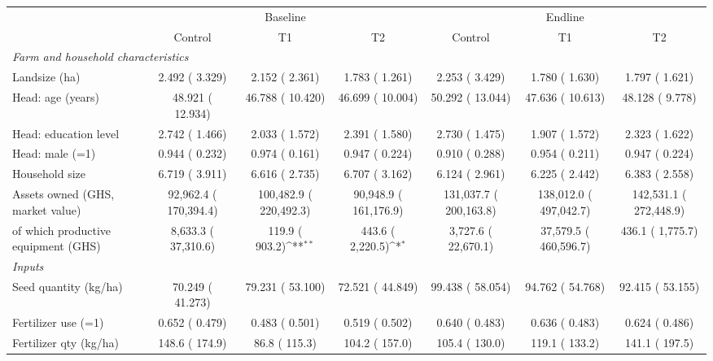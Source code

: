 \def\sym#1{\ifmmode^{#1}\else\(^{#1}\)\fi}
\begin{tabular}{lcccccc}
\toprule
 & \multicolumn{3}{c}{Baseline} & \multicolumn{3}{c}{Endline} \\
\cmidrule(lr){2-4}\cmidrule(lr){5-7}
 & Control & T1 & T2 & Control & T1 & T2 \\
\midrule
\multicolumn{7}{l}{\textit{Farm and household characteristics}}\\
Landsize (ha) &     2.492 (    3.329) &     2.152 (    2.361) &     1.783 (    1.261) &     2.253 (    3.429) &     1.780 (    1.630) &     1.797 (    1.621) \\
Head: age (years) &    48.921 (   12.934) &    46.788 (   10.420) &    46.699 (   10.004) &    50.292 (   13.044) &    47.636 (   10.613) &    48.128 (    9.778) \\
Head: education level &     2.742 (    1.466) &     2.033 (    1.572) &     2.391 (    1.580) &     2.730 (    1.475) &     1.907 (    1.572) &     2.323 (    1.622) \\
Head: male (=1) &     0.944 (    0.232) &     0.974 (    0.161) &     0.947 (    0.224) &     0.910 (    0.288) &     0.954 (    0.211) &     0.947 (    0.224) \\
Household size &     6.719 (    3.911) &     6.616 (    2.735) &     6.707 (    3.162) &     6.124 (    2.961) &     6.225 (    2.442) &     6.383 (    2.558) \\
Assets owned (GHS, market value) &     92,962.4 (   170,394.4) &    100,482.9 (   220,492.3) &     90,948.9 (   161,176.9) &    131,037.7 (   200,163.8) &    138,012.0 (   497,042.7) &    142,531.1 (   272,448.9) \\
\quad of which productive equipment (GHS) &      8,633.3 (    37,310.6) &        119.9 (       903.2)\sym{**} &        443.6 (     2,220.5)\sym{*} &      3,727.6 (    22,670.1) &     37,579.5 (   460,596.7) &        436.1 (     1,775.7) \\
\multicolumn{7}{l}{\textit{Inputs}}\\
Seed quantity (kg/ha) &    70.249 (   41.273) &    79.231 (   53.100) &    72.521 (   44.849) &    99.438 (   58.054) &    94.762 (   54.768) &    92.415 (   53.155) \\
Fertilizer use (=1) &     0.652 (    0.479) &     0.483 (    0.501) &     0.519 (    0.502) &     0.640 (    0.483) &     0.636 (    0.483) &     0.624 (    0.486) \\
Fertilizer qty (kg/ha) &        148.6 (       174.9) &         86.8 (       115.3) &        104.2 (       157.0) &        105.4 (       130.0) &        119.1 (       133.2) &        141.1 (       197.5) \\

\end{tabular}
